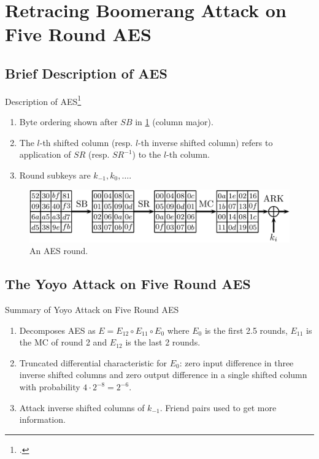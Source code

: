 \documentclass[notheorems]{beamer}
\theoremstyle{definition}
\theoremstyle{example}
\begin{document}
    \section[Application to AES]{Retracing Boomerang Attack on Five Round AES}
    \label{sec:retr-boomerang-aes}

    \subsection{Brief Description of AES}
    \label{subsec:aes-description}

    \begin{frame}{Description of AES\footcite{nationalinstituteofstandardsandtechnologyAdvancedEncryptionStandard2023}}
        \begin{enumerate}[<+->]
            \item Byte ordering shown after \(SB\) in \cref{fig:aes} (column
            major).
            \item The \(l\)-th shifted column (resp. \(l\)-th inverse shifted
            column) refers to application of \(SR\) (resp. \(SR^{-1}\)) to the
            \(l\)-th column.
            \item Round subkeys are \(k_{-1}, k_0, \ldots\).
        \end{enumerate}
        \begin{figure}[!ht]
            \centering
            \includegraphics[width=0.85\columnwidth]{images/aes.png}
            \caption{An AES round.}
            \label{fig:aes}
        \end{figure}
    \end{frame}

    \subsection{The Yoyo Attack on Five Round AES}
    \label{subsec:yoyo-aes}

    \begin{frame}[<+->]{Summary of Yoyo Attack on Five Round AES}
        \begin{enumerate}
            \item Decomposes AES as \(E = E_{12} \circ E_{11} \circ E_0\) where
            \(E_0\) is the first 2.5 rounds, \(E_{11}\) is the MC of round 2 and
            \(E_{12}\) is the last 2 rounds.
            \item Truncated differential characteristic for \(E_0\): zero input
            difference in three inverse shifted columns and zero output
            difference in a single shifted column with probability \(4 \cdot
            2^{-8} = 2^{-6}\).
            \item Attack inverse shifted columns of \(k_{-1}\). Friend pairs
            used to get more information.
        \end{enumerate}
    \end{frame}
\end{document}
